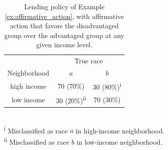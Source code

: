\begin{table}
\centering
\caption{Lending policy of Example \ref{ex:affirmative_action}, with
affirmative action that favors the disadvantaged group over the advantaged
group at any given income level.\label{table:toy2}}
\begin{tabular}{c c c}\toprule
& \multicolumn{2}{c}{True race} \\
Neighborhood & $a$ & $b$ \\
\midrule
high income & 70 (70\%) & 30 (80\%)\textsuperscript{i}\\ 
low income & 30 (20\%)\textsuperscript{ii} & 70 (30\%)\\ 
\bottomrule
\end{tabular}\\
\textsuperscript{i} Misclassified as race $a$ in high-income neighborhood.\\
\textsuperscript{ii} Misclassified as race $b$ in low-income neighborhood.
\end{table}


